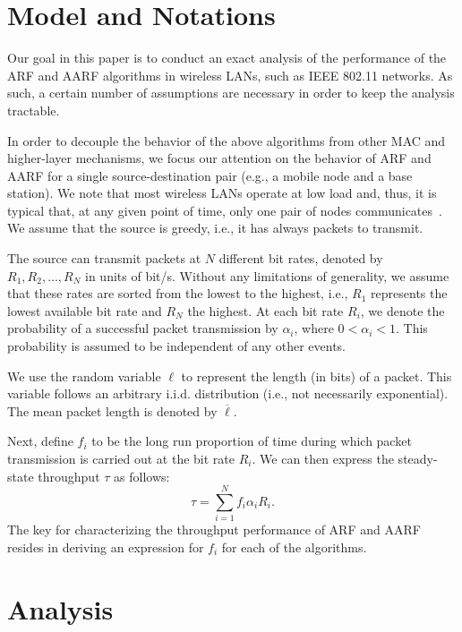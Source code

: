 \documentclass[11pt, journal, letterpaper, oneside, onecolumn]{IEEEtran}
\begin{document}
\section {Model and Notations}
\label{sec:Model and Notations}

Our goal in this paper is to conduct an exact analysis of the
performance of the ARF and AARF algorithms in wireless LANs, such
as IEEE 802.11 networks. As such, a certain number of assumptions
are necessary in order to keep the analysis tractable.

In order to decouple the behavior of the above algorithms from
other MAC and higher-layer mechanisms, we focus our attention on
the behavior of ARF and AARF for a single source-destination pair
(e.g., a mobile node and a base station). We note that most
wireless LANs operate at low load and, thus, it is typical that,
at any given point of time,  only one pair of nodes
communicates~\cite{Traffic}. We assume that the source is greedy,
i.e., it has always packets to transmit.


The source can transmit packets at $N$ different bit rates,
denoted by $R_1, R_2, \ldots, R_N$ in units of bit/s. Without any
limitations of generality, we  assume that these rates are sorted
from the lowest to the highest, i.e.,  $R_{1}$ represents the
lowest available bit rate and $R_{N}$ the highest. At each
bit rate $R_{i}$, we denote the probability of a successful packet
transmission by $\alpha_i$, where $0<\alpha_{i}<1$. This
probability is assumed to be independent of any other events.

We use the random variable $\ell$ to represent the length (in
bits) of a packet. This variable follows an arbitrary i.i.d.
distribution (i.e., not necessarily exponential). The mean packet
length is denoted by $\overline{\ell}$.




Next, define $f_{i}$ to be  the long run proportion of time during
which packet transmission is carried out at the bit rate $R_{i}$.
We can then express the steady-state throughput $\tau$ as follows:
\begin{equation}\label{eq:throughput}
\tau=\sum_{i=1}^{N}{f_{i}\alpha_{i}R_{i}}.
\end{equation}
The key for characterizing the throughput performance of ARF and
AARF resides in deriving an expression for $f_{i}$ for each of the
algorithms.






\section{Analysis}
\label{sec:analysis}
\end{document}
